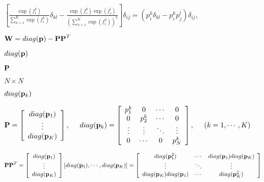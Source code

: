 \documentclass{article}
\def\lthtmlcheckvsize{\ifdim\ht\sizebox<\vsize 
  \ifdim\wd\sizebox<\hsize\expandafter\hfill\fi \expandafter\vfill
  \else\expandafter\vss\fi}%
\begin{document}
{\newpage\clearpage
{}%
$\displaystyle \left[\frac{\exp(f_i^k)}{\sum_{h=1}^K\exp(f_i^h)}\delta_{kl}
-\frac{\exp(f_i^k)\exp(f_j^l)}{\left(\sum_{h=1}^K\exp(f_i^h)\right)^2}\right]
\delta_{ij}
=(p_i^k\delta_{kl}-p_i^k p_j^l)\delta_{ij},$%
\lthtmlindisplaymathZ
\lthtmlcheckvsize\clearpage}

{\newpage\clearpage
{}%
$\displaystyle {\bf W}=diag({\bf p})-{\bf PP}^T$%
\lthtmlindisplaymathZ
\lthtmlcheckvsize\clearpage}

{\newpage\clearpage
{}%
$ diag({\bf p})$%
\lthtmlindisplaymathZ
\lthtmlcheckvsize\clearpage}

{\newpage\clearpage
{}%
$ {\bf P}$%
\lthtmlindisplaymathZ
\lthtmlcheckvsize\clearpage}

{\newpage\clearpage
{}%
$ N\times N$%
\lthtmlindisplaymathZ
\lthtmlcheckvsize\clearpage}

{\newpage\clearpage
{}%
$ diag({\bf p}_k)$%
\lthtmlindisplaymathZ
\lthtmlcheckvsize\clearpage}

{\newpage\clearpage
{}%
$\displaystyle {\bf P}=\left[\begin{array}{c}diag({\bf p}_1)\\
\vdots\\diag({\bf p}_K)\end{array}\right],\;\;\;\;\;
diag({\bf p}_k)=\left[\begin{array}{cccc}p_1^k & 0 & \cdots & 0\\
0 & p_2^k & \cdots & 0\\\vdots & \vdots & \ddots & \vdots\\
0 & \cdots & 0 & p_N^k
\end{array}\right],\;\;\;\;\;(k=1,\cdots,K)$%
\lthtmlindisplaymathZ
\lthtmlcheckvsize\clearpage}

{\newpage\clearpage
{}%
$\displaystyle {\bf PP}^T=\left[\begin{array}{c}diag({\bf p}_1)\\
\vdots\\diag({\bf p}_K)\end{array}\right]
\left[diag({\bf p}_1),\cdots,diag({\bf p}_K)\right]
=\left[\begin{array}{ccc}diag({\bf p}_1^2) & \cdots & diag({\bf p}_1) diag({\bf p}_K)\\
\vdots & \ddots & \vdots \\
diag({\bf p}_K) diag({\bf p}_1) & \cdots & diag({\bf p}_K^2)
\end{array}\right]$%
\lthtmlindisplaymathZ
\lthtmlcheckvsize\clearpage}
\end{document}
